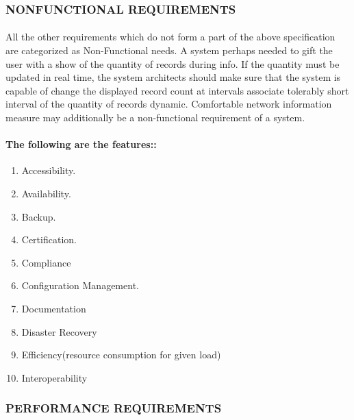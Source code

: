 \subsubsection{NONFUNCTIONAL REQUIREMENTS}
\paragraph{} All the other requirements which do not form a part of the above specification are categorized as Non-Functional needs. A system perhaps needed to gift the user with a show of the quantity of records during info. If the quantity must be updated in real time, the system architects should make sure that the system is capable of change the displayed record count at intervals associate tolerably short interval of the quantity of records dynamic. Comfortable network information measure may additionally be a non-functional requirement of a system.\\

\paragraph{The following are the features::}
\begin{enumerate}
\item Accessibility.
\item Availability.
\item Backup.
\item Certification.
\item Compliance
\item Configuration Management.
\item Documentation
\item Disaster Recovery
\item Efficiency(resource consumption for given load)
\item Interoperability
\end{enumerate}

\subsubsection{PERFORMANCE REQUIREMENTS}
